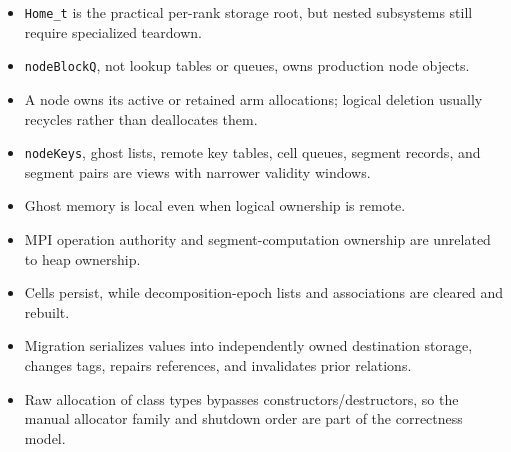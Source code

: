 \documentclass[11pt]{article}
\newcommand{\code}[1]{\texorpdfstring{\nolinkurl{#1}}{#1}}
\begin{document}
\begin{itemize}
\item \code{Home_t} is the practical per-rank storage root, but nested
subsystems still require specialized teardown.
\item \code{nodeBlockQ}, not lookup tables or queues, owns production node
objects.
\item A node owns its active or retained arm allocations; logical deletion
usually recycles rather than deallocates them.
\item \code{nodeKeys}, ghost lists, remote key tables, cell queues, segment
records, and segment pairs are views with narrower validity windows.
\item Ghost memory is local even when logical ownership is remote.
\item MPI operation authority and segment-computation ownership are unrelated
to heap ownership.
\item Cells persist, while decomposition-epoch lists and associations are
cleared and rebuilt.
\item Migration serializes values into independently owned destination
storage, changes tags, repairs references, and invalidates prior relations.
\item Raw allocation of class types bypasses constructors/destructors, so the
manual allocator family and shutdown order are part of the correctness model.
\end{itemize}
\end{document}
